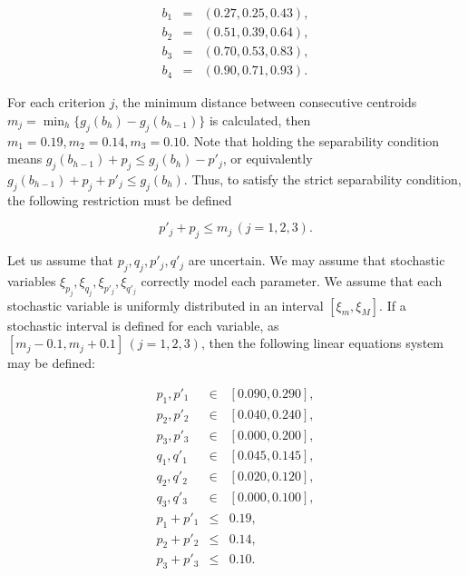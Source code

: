 \documentclass[]{elsarticle}
\theoremstyle{definition}
\begin{document}
\begin{eqnarray}
b_1&=&(0.27, 0.25, 0.43), \nonumber\\
b_2&=&(0.51, 0.39, 0.64), \nonumber\\
b_3&=&(0.70, 0.53, 0.83), \nonumber\\
b_4&=&(0.90, 0.71, 0.93). \nonumber
\end{eqnarray}

\noindent
For each criterion $j$, the minimum distance between consecutive centroids $m_j=\min_{h} \{g_j(b_h)-g_j(b_{h-1})\}$ is calculated, then $m_1=0.19, m_2=0.14, m_3=0.10$. Note that holding the separability condition means  $g_j(b_{h-1})+p_j \leq g_j(b_h)-p'_j$, or equivalently $g_j(b_{h-1})+p_j+p'_j \leq g_j(b_h)$. Thus, to satisfy the strict separability condition, the following restriction must be defined

\begin{equation}
p'_j+p_j \leq m_j \, (j=1,2,3). \label{thresholds}
\end{equation}



Let us assume that  $p_j,q_j,p'_j,q'_j$ are uncertain.  We may assume that stochastic variables $\xi_{p_j},\xi_{q_j},\xi_{p'_j},\xi_{q'_j}$ correctly model each parameter. We assume that each stochastic variable is uniformly distributed in an interval  $[\xi_m, \xi_M]$. If a stochastic interval is defined for each variable, as $[m_j-0.1, m_j+0.1] \,(j=1,2,3)$, then the following linear equations system may be defined:

\begin{eqnarray}
p_1,p'_1 &\in& [0.090, 0.290], \nonumber\\
p_2,p'_2 &\in& [0.040, 0.240], \nonumber\\
p_3,p'_3 &\in& [0.000, 0.200], \nonumber\\
q_1,q'_1 &\in& [0.045, 0.145], \nonumber\\
q_2,q'_2 &\in& [0.020, 0.120], \nonumber\\
q_3,q'_3 &\in& [0.000, 0.100], \nonumber\\
p_1+p'_1 &\leq& 0.19, \nonumber\\
p_2+p'_2 &\leq& 0.14,  \nonumber\\
p_3+p'_3 &\leq& 0.10. \nonumber
\end{eqnarray}
\end{document}
